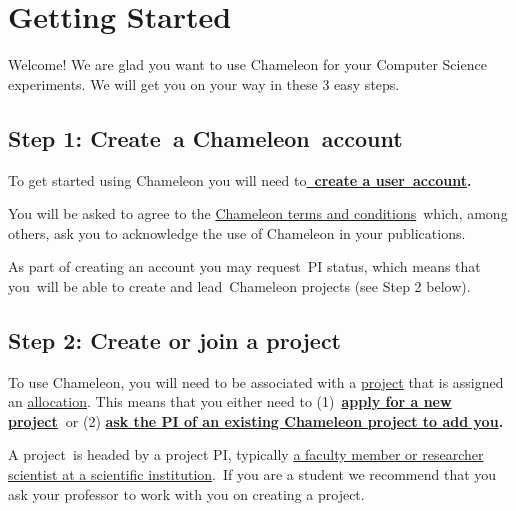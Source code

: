 
\chapter{Getting Started}\label{getting-started}

Welcome! We are glad you want to use Chameleon for your Computer Science
experiments. We will get you on your way in these 3 easy steps.~

\section{Step 1: Create~a Chameleon~account}\label{accounts}

To get started using Chameleon you will need
to\textbf{\href{https://www.chameleoncloud.org/register}{~create a
user~account}.}~

You will be asked to agree to the
\href{https://www.chameleoncloud.org/terms/view/chameleon-user-terms/}{Chameleon
terms and conditions}~which, among others, ask you to acknowledge the
use of Chameleon in your publications.~

As part of creating an account you may request~PI status, which means
that you~will be able to create and lead~Chameleon projects (see Step 2
below).~

\section{Step 2: Create or join a project}\label{allocations}

To use Chameleon, you will need to be associated with a
\href{https://www.chameleoncloud.org/docs/user-faq/\#toc-how-do-i-apply-for-a-chameleon-project-}{project}
that is assigned an
\href{https://www.chameleoncloud.org/docs/user-faq/\#toc-what-are-the-project-allocation-sizes-and-limits-}{allocation}.
This means that you either need to
(1)~\textbf{\href{https://www.chameleoncloud.org/user/projects/new/}{apply
for a new project}~}or (2)
\textbf{\href{https://www.chameleoncloud.org/docs/user-faq/\#toc-my-pi-professor-colleague-already-has-a-chameleon-project-how-do-i-get-added-as-a-user-on-the-project-}{ask
the PI of an existing Chameleon project to add you}.}

A project~is headed by a project PI, typically
\href{https://www.chameleoncloud.org/docs/user-faq/\#toc-who-is-eligible-to-be-chameleon-pi-and-how-do-i-make-sure-that-my-pi-status-is-reflected-in-my-profile-}{a
faculty member or researcher scientist at a scientific institution}.~If
you are a student we recommend that you ask your professor to work with
you on creating a project.~

